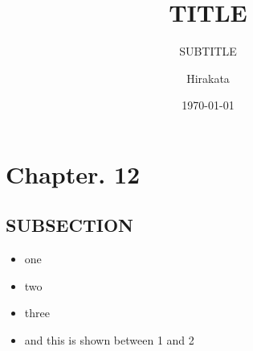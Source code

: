 \documentclass[12pt, dvipdfmx, default, cjk]{beamer}
\title{TITLE}
\subtitle{SUBTITLE}
\author[cympfh]{Hirakata}
\institute[CS]{Univ. of Tokyo, CS}
\date{\today}
\begin{document}
\section{Chapter. 12}

\begin{frame}
  \titlepage
\end{frame}

\subsection{SUBSECTION}

\begin{frame}

  \begin{itemize}
    \item<1-> one
    \item<2-> two
    \item<3-> three
    \item<1-2> and this is shown between 1 and 2
  \end{itemize}
\end{frame}
\end{document}
